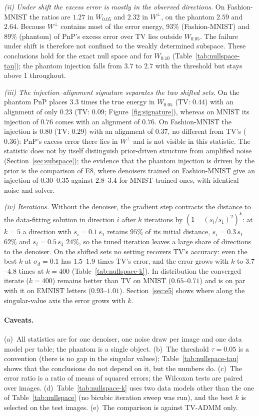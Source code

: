 \emph{(ii) Under shift the excess error is mostly in the observed directions.} On Fashion-MNIST the ratios are $1.27$ in $W_{0.05}$ and $2.32$ in $W^\perp$, on the phantom $2.59$ and $2.64$. Because $W^\perp$ contains most of the error energy, $93\%$ (Fashion-MNIST) and $89\%$ (phantom) of PnP's excess error over TV lies outside $W_{0.05}$.
The failure under shift is therefore not confined to the weakly determined subspace. These conclusions hold for the exact null space and for $W_{0.10}$ (Table~\ref{tab:nullspace-tau}); the phantom injection falls from $3.7$ to $2.7$ with the threshold but stays above 1 throughout.

\emph{(iii) The injection--alignment signature separates the two shifted sets.} On the phantom PnP places $3.3$ times the true energy in $W_{0.05}$ (TV: $0.44$) with an alignment of only $0.23$ (TV: $0.09$; Figure~\ref{fig:signature}), whereas on MNIST its injection of $0.76$ comes with an alignment of $0.76$.
On Fashion-MNIST the injection is $0.80$ (TV: $0.29$) with an alignment of $0.37$, no different from TV's ($0.36$): PnP's excess error there lies in $W^\perp$ and is not visible in this statistic. The statistic does not by itself distinguish prior-driven structure from amplified noise (Section~\ref{sec:subspace});
the evidence that the phantom injection is driven by the prior is the comparison of E8, where denoisers trained on Fashion-MNIST give an injection of $0.30$--$0.35$ against $2.8$--$3.4$ for MNIST-trained ones, with identical noise and solver.

\emph{(iv) Iterations.} Without the denoiser, the gradient step contracts the distance to the data-fitting solution in direction $i$ after $k$ iterations by $(1-(s_i/s_1)^2)^k$: at $k=5$ a direction with $s_i=0.1\,s_1$ retains $95\%$ of its initial distance, $s_i=0.3\,s_1$ $62\%$ and $s_i=0.5\,s_1$ $24\%$, so the tuned iteration leaves a large share of directions to the denoiser.
On the shifted sets no setting recovers TV's accuracy: even the best $k$ at $\sigma_d=0.1$ has $1.5$--$1.9$ times TV's error, and the error grows with $k$ to $3.7$--$4.8$ times at $k=400$ (Table~\ref{tab:nullspace-k}). In distribution the converged iterate ($k=400$) remains better than TV on MNIST ($0.65$--$0.71$) and is on par with it on EMNIST letters ($0.93$--$1.01$). Section~\ref{sec:e5} shows where along the singular-value axis the error grows with $k$.

\paragraph{Caveats.}
(a)~All statistics are for one denoiser, one noise draw per image and one data model per table; the phantom is a single object. (b)~The threshold $\tau=0.05$ is a convention (there is no gap in the singular values); Table~\ref{tab:nullspace-tau} shows that the conclusions do not depend on it, but the numbers do. (c)~The error ratio is a ratio of means of squared errors; the Wilcoxon tests are paired over images.
(d)~Table~\ref{tab:nullspace-k} uses two data models other than the one of Table~\ref{tab:nullspace} (no bicubic iteration sweep was run), and the best $k$ is selected on the test images. (e)~The comparison is against TV-ADMM only.



